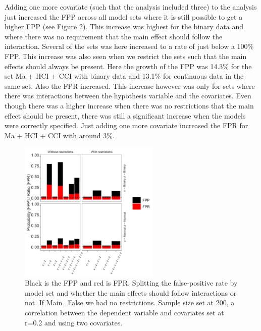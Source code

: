 Adding one more covariate (such that the analysis included three) to the analysis just increased the FPP across all model sets where it is still possible to get a higher FPP (see Figure 2). This increase was highest for the binary data and where there was no requirement that the main effect should follow the interaction. Several of the sets was here increased to a rate of just below a 100\% FPP. This increase was also seen when we restrict the sets such that the main effects should always be present. Here the growth of the FPP was 14.3\% for the set Ma + HCI + CCI with binary data and 13.1\% for continuous data in the same set. Also the FPR increased. This increase however was only for sets where there was interactions between the hypothesis variable and the covariates. Even though there was a higher increase when there was no restrictions that the main effect should be present, there was still a significant increase when the models were correctly specified. Just adding one more covariate increased the FPR for Ma + HCI + CCI with around 3\%. 

\begin{figure}[t]
\includegraphics[width=0.6\textwidth]{R/Analysis/Result/Figures/Figure1A.jpeg}
\centering
\caption{Black is the FPP and red is FPR.  Splitting the false-positive rate by model set and whether the main effects should follow interactions or not. If Main=False we had no restrictions. Sample size set at 200, a correlation between the dependent variable and covariates set at r=0.2 and using two covariates.}
\label{fig:mainfigure}
\end{figure}

